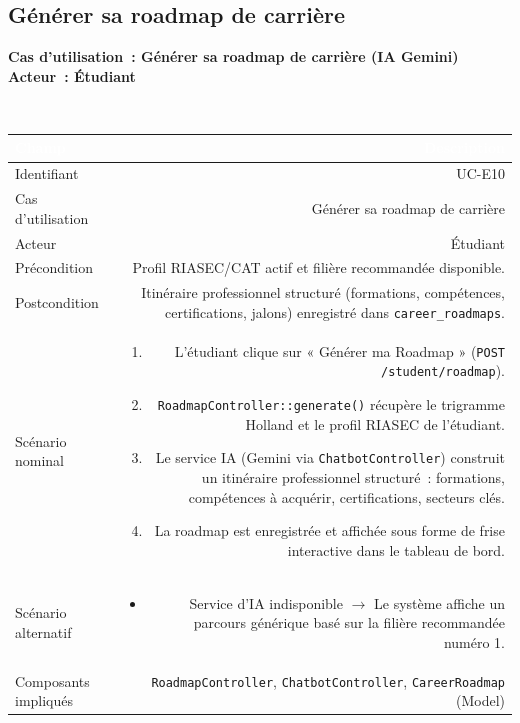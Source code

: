 \documentclass[a4paper,12pt]{article}
\newcommand{\ucheader}[2]{%
  \noindent\colorbox{capblue}{\parbox{\dimexpr\linewidth-2\fboxsep}{%
    \color{white}\bfseries\large Cas d'utilisation~: #1 \hfill \normalsize Acteur~: #2
  }}\\[2pt]
}
\begin{document}
\vspace{1em}

\subsection{Générer sa roadmap de carrière}
\ucheader{Générer sa roadmap de carrière (IA Gemini)}{Étudiant}

\noindent
\begin{tabular}{|L|R|}
\hline
{}\textcolor{white}{\textbf{Champ}} & \textcolor{white}{\textbf{Description}} \\
\hline
{}Identifiant & UC-E10 \\
\hline
Cas d'utilisation & Générer sa roadmap de carrière \\
\hline
{}Acteur & Étudiant \\
\hline
Précondition & Profil RIASEC/CAT actif et filière recommandée disponible. \\
\hline
{}Postcondition & Itinéraire professionnel structuré (formations, compétences, certifications, jalons) enregistré dans \texttt{career\_roadmaps}. \\
\hline
Scénario nominal &
\begin{enumerate}
  \item L'étudiant clique sur « Générer ma Roadmap » (\texttt{POST /student/roadmap}).
  \item \texttt{RoadmapController::generate()} récupère le trigramme Holland et le profil RIASEC de l'étudiant.
  \item Le service IA (Gemini via \texttt{ChatbotController}) construit un itinéraire professionnel structuré~: formations, compétences à acquérir, certifications, secteurs clés.
  \item La roadmap est enregistrée et affichée sous forme de frise interactive dans le tableau de bord.
\end{enumerate} \\
\hline
{}Scénario alternatif &
\begin{itemize}
  \item Service d'IA indisponible $\rightarrow$ Le système affiche un parcours générique basé sur la filière recommandée numéro 1.
\end{itemize} \\
\hline
Composants impliqués & \texttt{RoadmapController}, \texttt{ChatbotController}, \texttt{CareerRoadmap} (Model) \\
\hline
\end{tabular}
\end{document}
